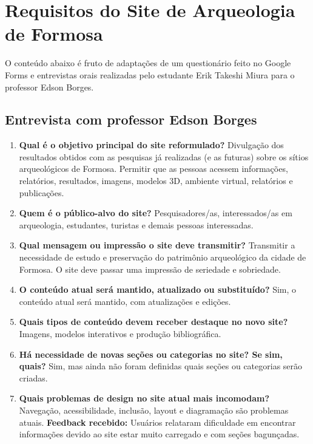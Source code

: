 \section{Requisitos do Site de Arqueologia de Formosa}

O conteúdo abaixo é fruto de adaptações de um questionário feito no Google Forms e entrevistas orais realizadas pelo estudante Erik Takeshi Miura para o professor Edson Borges.

\subsection{Entrevista com professor Edson Borges}

\begin{enumerate}
    \item \textbf{Qual é o objetivo principal do site reformulado?}  
    Divulgação dos resultados obtidos com as pesquisas já realizadas (e as futuras) sobre os sítios arqueológicos de Formosa.  
    Permitir que as pessoas acessem informações, relatórios, resultados, imagens, modelos 3D, ambiente virtual, relatórios e publicações.

    \item \textbf{Quem é o público-alvo do site?}  
    Pesquisadores/as, interessados/as em arqueologia, estudantes, turistas e demais pessoas interessadas.

    \item \textbf{Qual mensagem ou impressão o site deve transmitir?}  
    Transmitir a necessidade de estudo e preservação do patrimônio arqueológico da cidade de Formosa.  
    O site deve passar uma impressão de seriedade e sobriedade.

    \item \textbf{O conteúdo atual será mantido, atualizado ou substituído?}  
    Sim, o conteúdo atual será mantido, com atualizações e edições.

    \item \textbf{Quais tipos de conteúdo devem receber destaque no novo site?}  
    Imagens, modelos interativos e produção bibliográfica.

    \item \textbf{Há necessidade de novas seções ou categorias no site? Se sim, quais?}  
    Sim, mas ainda não foram definidas quais seções ou categorias serão criadas.

    \item \textbf{Quais problemas de design no site atual mais incomodam?}  
    Navegação, acessibilidade, inclusão, layout e diagramação são problemas atuais.  
    \textbf{Feedback recebido:} Usuários relataram dificuldade em encontrar informações devido ao site estar muito carregado e com seções bagunçadas.


\end{enumerate}
